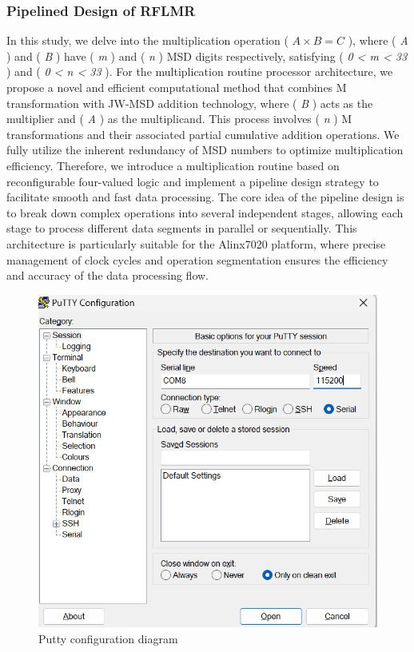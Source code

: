 \documentclass[electronics,article,accept,pdftex,moreauthors]{Definitions/mdpi}
\begin{document}
\subsubsection{Pipelined Design of RFLMR}
In this study, we delve into the multiplication operation ( $A \times B = C$ ), where ( \textit{A} ) and ( \textit{B} ) have ( \textit{m} ) and (\textit{ n} ) MSD digits respectively, satisfying ( \textit{0 < m < 33} ) and (\textit{ 0 < n < 33} ). For the multiplication routine processor architecture, we propose a novel and efficient computational method that combines M transformation with JW-MSD addition technology, where ( \textit{B} ) acts as the multiplier and ( \textit{A} ) as the multiplicand. This process involves ( \textit{n }) M transformations and their associated partial cumulative addition operations. We fully utilize the inherent redundancy of MSD numbers to optimize multiplication efficiency. Therefore, we introduce a multiplication routine based on reconfigurable four-valued logic and implement a pipeline design strategy to facilitate smooth and fast data processing. The core idea of the pipeline design is to break down complex operations into several independent stages, allowing each stage to process different data segments in parallel or sequentially. This architecture is particularly suitable for the Alinx7020 platform, where precise management of clock cycles and operation segmentation ensures the efficiency and accuracy of the data processing flow.
\begin{figure}[H]
    \includegraphics[scale=0.8]{./images/4.png}
    \caption{Putty configuration diagram}
    \label{fig4}
\end{figure}
\end{document}
